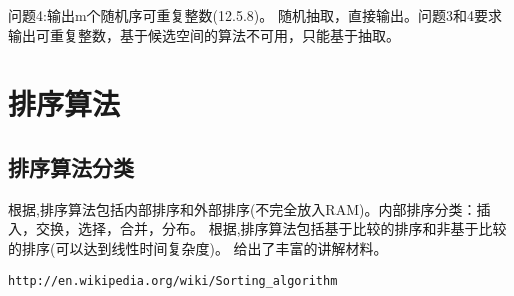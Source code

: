 问题4:输出m个随机序可重复整数(\cite{pp}12.5.8)。
随机抽取，直接输出。问题3和4要求输出可重复整数，基于候选空间的算法不可用，只能基于抽取。








\section{排序算法}

\subsection{排序算法分类}
\label{subsec:sortAthmClass}

根据\cite{acp},排序算法包括内部排序和外部排序(不完全放入RAM)。内部排序分类：插入，交换，选择，合并，分布。
根据\cite{ita},排序算法包括基于比较的排序和非基于比较的排序(可以达到线性时间复杂度)。
\cite{weijipedia}给出了丰富的讲解材料。
\begin{verbatim}
http://en.wikipedia.org/wiki/Sorting_algorithm
\end{verbatim}


